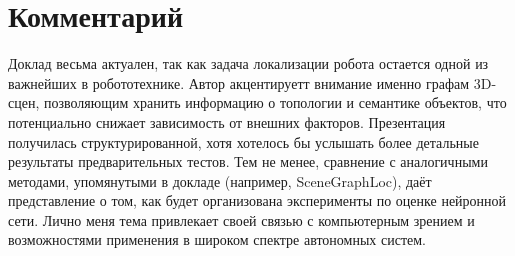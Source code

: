 \documentclass[11pt]{article}
\begin{document}
\section*{Комментарий}
Доклад весьма актуален, так как задача локализации робота остается одной из важнейших в робототехнике. Автор 
акцентируетт внимание именно графам 3D-сцен, позволяющим хранить информацию о топологии и семантике объектов, что 
потенциально снижает зависимость от внешних факторов. Презентация получилась структурированной, хотя хотелось 
бы услышать более детальные результаты предварительных тестов. Тем не менее, сравнение с аналогичными методами, упомянутыми 
в докладе (например, SceneGraphLoc), даёт представление о том, как будет организована эксперименты по оценке нейронной сети. 
Лично меня тема привлекает своей связью с компьютерным зрением и возможностями применения в широком спектре автономных систем.
\end{document}
